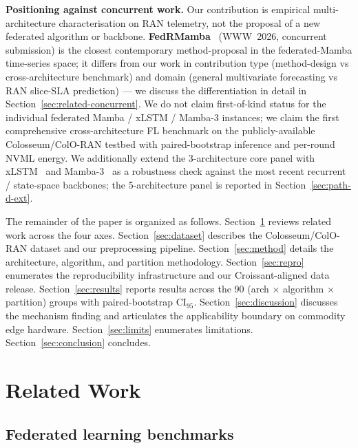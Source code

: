 \documentclass[journal]{IEEEtran}
\begin{document}
\textbf{Positioning against concurrent work.} Our contribution is empirical multi-architecture characterisation on RAN telemetry, not the proposal of a new federated algorithm or backbone. \textbf{FedRMamba}~\cite{FedRMamba2026} (WWW~2026, concurrent submission) is the closest contemporary method-proposal in the federated-Mamba time-series space; it differs from our work in contribution type (method-design vs cross-architecture benchmark) and domain (general multivariate forecasting vs RAN slice-SLA prediction) --- we discuss the differentiation in detail in Section~\ref{sec:related-concurrent}. We do not claim first-of-kind status for the individual federated Mamba / xLSTM / Mamba-3 instances; we claim the first comprehensive cross-architecture FL benchmark on the publicly-available Colosseum/ColO-RAN testbed with paired-bootstrap inference and per-round NVML energy. We additionally extend the 3-architecture core panel with xLSTM~\cite{Beck2024_xLSTM} and Mamba-3~\cite{Lahoti2026_Mamba3} as a robustness check against the most recent recurrent / state-space backbones; the 5-architecture panel is reported in Section~\ref{sec:path-d-ext}.

The remainder of the paper is organized as follows. Section~\ref{sec:related} reviews related work across the four axes. Section~\ref{sec:dataset} describes the Colosseum/ColO-RAN dataset and our preprocessing pipeline. Section~\ref{sec:method} details the architecture, algorithm, and partition methodology. Section~\ref{sec:repro} enumerates the reproducibility infrastructure and our Croissant-aligned data release. Section~\ref{sec:results} reports results across the 90 (arch $\times$ algorithm $\times$ partition) groups with paired-bootstrap CI$_{95}$. Section~\ref{sec:discussion} discusses the mechanism finding and articulates the applicability boundary on commodity edge hardware. Section~\ref{sec:limits} enumerates limitations. Section~\ref{sec:conclusion} concludes.


\section{Related Work}\label{sec:related}

\subsection{Federated learning benchmarks}
\end{document}
